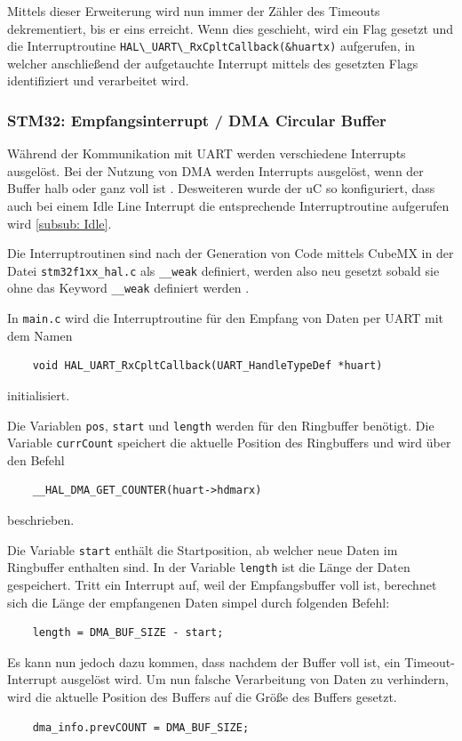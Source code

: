   Mittels dieser Erweiterung wird nun immer der Zähler des Timeouts dekrementiert, bis er eins erreicht. Wenn dies geschieht, wird ein Flag gesetzt
  und die Interruptroutine \lstinline!HAL\_UART\_RxCpltCallback(&huartx)! aufgerufen, in welcher anschließend der aufgetauchte Interrupt mittels des
  gesetzten Flags identifiziert und verarbeitet wird.
  
  \subsubsection{STM32: Empfangsinterrupt / DMA Circular Buffer}
  \label{subsub: Empfang}

  Während der Kommunikation mit \ac{UART} werden verschiedene Interrupts ausgelöst. Bei der Nutzung von \ac{DMA} werden Interrupts ausgelöst,
  wenn der Buffer halb oder ganz voll ist \citep{STM32_Ref}. Desweiteren wurde der \ac{uC} so konfiguriert, dass auch bei einem Idle Line Interrupt
  die entsprechende Interruptroutine aufgerufen wird \ref{subsub: Idle}.

  \smallskip

  Die Interruptroutinen sind nach der Generation von Code mittels CubeMX in der Datei \lstinline!stm32f1xx_hal.c! als \lstinline!__weak!
  definiert, werden also neu gesetzt sobald sie ohne das Keyword \lstinline!__weak! definiert werden \citep{HAL_Description}. 

  \smallskip

  In \lstinline!main.c! wird die Interruptroutine für den Empfang von Daten per \ac{UART} mit dem Namen 
  \begin{lstlisting}
    void HAL_UART_RxCpltCallback(UART_HandleTypeDef *huart)
  \end{lstlisting}
  initialisiert. 
  
  \smallskip

  Die Variablen \lstinline!pos!, \lstinline!start! und \lstinline!length! werden für den Ringbuffer benötigt. Die Variable \lstinline!currCount! speichert die aktuelle Position des
  Ringbuffers und wird über den Befehl
  
  \begin{lstlisting}
    __HAL_DMA_GET_COUNTER(huart->hdmarx)
  \end{lstlisting}
  beschrieben.

  \smallskip

  Die Variable \lstinline!start! enthält die Startposition, ab welcher neue Daten im Ringbuffer enthalten sind. In der Variable \lstinline!length!
  ist die Länge der Daten gespeichert. Tritt ein Interrupt auf, weil der Empfangsbuffer voll ist, berechnet sich die Länge der empfangenen 
  Daten simpel durch folgenden Befehl:
  \begin{lstlisting}
    length = DMA_BUF_SIZE - start;
  \end{lstlisting}
  Es kann nun jedoch dazu kommen, dass nachdem der Buffer voll ist, ein Timeout-Interrupt ausgelöst wird. Um nun falsche Verarbeitung von 
  Daten zu verhindern, wird die aktuelle Position des Buffers auf die Größe des Buffers gesetzt.
  \begin{lstlisting}
    dma_info.prevCOUNT = DMA_BUF_SIZE;      
  \end{lstlisting}

